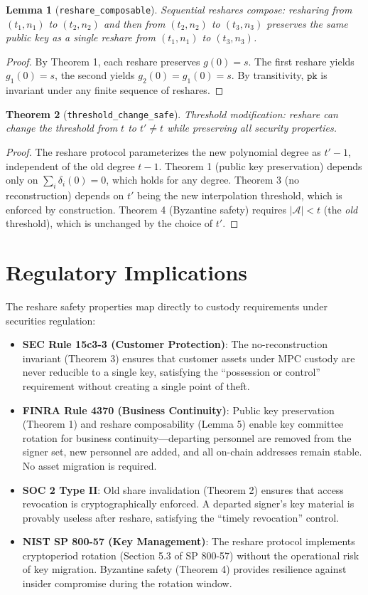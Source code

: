 \documentclass[11pt]{article}
\newtheorem{theorem}{Theorem}
\newtheorem{lemma}[theorem]{Lemma}
\begin{document}
\begin{lemma}[\texttt{reshare\_composable}]
Sequential reshares compose: resharing from $(t_1, n_1)$ to $(t_2, n_2)$ and then from $(t_2, n_2)$ to $(t_3, n_3)$ preserves the same public key as a single reshare from $(t_1, n_1)$ to $(t_3, n_3)$.
\end{lemma}
\begin{proof}
By Theorem 1, each reshare preserves $g(0) = s$. The first reshare yields $g_1(0) = s$, the second yields $g_2(0) = g_1(0) = s$. By transitivity, $\texttt{pk}$ is invariant under any finite sequence of reshares.
\end{proof}

\begin{theorem}[\texttt{threshold\_change\_safe}]
Threshold modification: reshare can change the threshold from $t$ to $t' \neq t$ while preserving all security properties.
\end{theorem}
\begin{proof}
The reshare protocol parameterizes the new polynomial degree as $t'-1$, independent of the old degree $t-1$. Theorem 1 (public key preservation) depends only on $\sum_i \delta_i(0) = 0$, which holds for any degree. Theorem 3 (no reconstruction) depends on $t'$ being the new interpolation threshold, which is enforced by construction. Theorem 4 (Byzantine safety) requires $|\mathcal{A}| < t$ (the \emph{old} threshold), which is unchanged by the choice of $t'$.
\end{proof}


\section{Regulatory Implications}

The reshare safety properties map directly to custody requirements under securities regulation:

\begin{itemize}
  \item \textbf{SEC Rule 15c3-3 (Customer Protection)}: The no-reconstruction invariant (Theorem 3) ensures that customer assets under MPC custody are never reducible to a single key, satisfying the ``possession or control'' requirement without creating a single point of theft.
  \item \textbf{FINRA Rule 4370 (Business Continuity)}: Public key preservation (Theorem 1) and reshare composability (Lemma 5) enable key committee rotation for business continuity---departing personnel are removed from the signer set, new personnel are added, and all on-chain addresses remain stable. No asset migration is required.
  \item \textbf{SOC 2 Type II}: Old share invalidation (Theorem 2) ensures that access revocation is cryptographically enforced. A departed signer's key material is provably useless after reshare, satisfying the ``timely revocation'' control.
  \item \textbf{NIST SP 800-57 (Key Management)}: The reshare protocol implements cryptoperiod rotation (Section 5.3 of SP 800-57) without the operational risk of key migration. Byzantine safety (Theorem 4) provides resilience against insider compromise during the rotation window.
\end{itemize}
\end{document}
